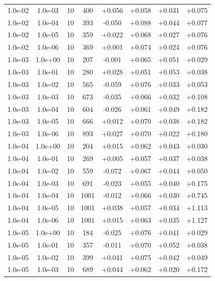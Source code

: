 \documentclass[11pt,a4paper]{article}
\begin{document}
\begin{table}[t]
{\begin{tabular}{*{8}c}
 1.0e-02 	 & 1.0e-03 	 & 10 & 400 	 & +0.056 & +0.058 & +0.031 & +0.075 \\ 
 1.0e-02 	 & 1.0e-04 	 & 10 & 393 	 & -0.050 & +0.088 & +0.044 & +0.077 \\ 
 1.0e-02 	 & 1.0e-05 	 & 10 & 359 	 & +0.022 & +0.068 & +0.027 & +0.076 \\ 
 1.0e-02 	 & 1.0e-06 	 & 10 & 369 	 & +0.001 & +0.074 & +0.024 & +0.076 \\ 
 1.0e-03 	 & 1.0e+00 	 & 10 & 207 	 & -0.001 & +0.065 & +0.051 & +0.029 \\ 
 1.0e-03 	 & 1.0e-01 	 & 10 & 280 	 & +0.028 & +0.051 & +0.053 & +0.038 \\ 
 1.0e-03 	 & 1.0e-02 	 & 10 & 565 	 & -0.059 & +0.076 & +0.033 & +0.053 \\ 
 \rowcolor{orange} 1.0e-03 	 & 1.0e-03 	 & 10 & 673 	 & -0.035 & +0.066 & +0.032 & +0.108 \\ 
 \rowcolor{orange} 1.0e-03 	 & 1.0e-04 	 & 10 & 604 	 & -0.026 & +0.061 & +0.049 & +0.182 \\ 
 \rowcolor{orange} 1.0e-03 	 & 1.0e-05 	 & 10 & 666 	 & +0.012 & +0.070 & +0.038 & +0.182 \\ 
 \rowcolor{orange} 1.0e-03 	 & 1.0e-06 	 & 10 & 893 	 & +0.027 & +0.070 & +0.022 & +0.180 \\ 
 1.0e-04 	 & 1.0e+00 	 & 10 & 204 	 & +0.015 & +0.062 & +0.043 & +0.030 \\ 
 1.0e-04 	 & 1.0e-01 	 & 10 & 269 	 & +0.005 & +0.057 & +0.037 & +0.038 \\ 
 1.0e-04 	 & 1.0e-02 	 & 10 & 559 	 & -0.072 & +0.067 & +0.044 & +0.050 \\ 
\rowcolor{orange} 1.0e-04 	 & 1.0e-03 	 & 10 & 691 	 & -0.023 & +0.055 & +0.040 & +0.175 \\ 
\rowcolor{red}  1.0e-04 	 & 1.0e-04 	 & 10 & 1001 	 & -0.012 & +0.066 & +0.030 & +0.745 \\ 
\rowcolor{red}  1.0e-04 	 & 1.0e-05 	 & 10 & 1001 	 & +0.038 & +0.057 & +0.034 & +1.113 \\ 
\rowcolor{red} 1.0e-04 	 & 1.0e-06 	 & 10 & 1001 	 & +0.015 & +0.063 & +0.035 & +1.127 \\ 
 1.0e-05 	 & 1.0e+00 	 & 10 & 184 	 & -0.025 & +0.076 & +0.041 & +0.029 \\ 
 1.0e-05 	 & 1.0e-01 	 & 10 & 357 	 & -0.011 & +0.070 & +0.052 & +0.038 \\ 
 1.0e-05 	 & 1.0e-02 	 & 10 & 399 	 & +0.041 & +0.075 & +0.042 & +0.049 \\ 
 \rowcolor{orange} 1.0e-05 	 & 1.0e-03 	 & 10 & 689 	 & +0.044 & +0.062 & +0.020 & +0.172 \\ 

\end{tabular}}
\end{table}
\end{document}
